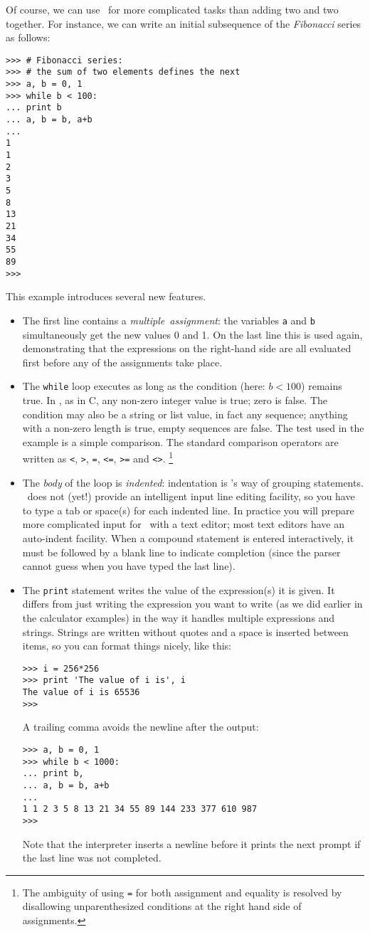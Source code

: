 Of course, we can use \Python\ for more complicated tasks than adding two
and two together.
For instance, we can write an initial subsequence of the
{\em Fibonacci}
series as follows:
\bcode\begin{verbatim}
>>> # Fibonacci series:
>>> # the sum of two elements defines the next
>>> a, b = 0, 1
>>> while b < 100:
... print b
... a, b = b, a+b
...
1
1
2
3
5
8
13
21
34
55
89
>>>
\end{verbatim}\ecode
This example introduces several new features.
\begin{itemize}
\item
The first line contains a
{\em multiple\ assignment}:
the variables
{\tt a}
and
{\tt b}
simultaneously get the new values 0 and 1.
On the last line this is used again, demonstrating that the expressions
on the right-hand side are all evaluated first before any of the
assignments take place.
\item
The
{\tt while}
loop executes as long as the condition (here: $b < 100$) remains true.
In \Python, as in C, any non-zero integer value is true; zero is false.
The condition may also be a string or list value, in fact any sequence;
anything with a non-zero length is true, empty sequences are false.
The test used in the example is a simple comparison.
The standard comparison operators are written as
{\tt <},
{\tt >},
{\tt =},
{\tt <=},
{\tt >=}
and
{\tt <>}.%
\footnote{
 The ambiguity of using {\tt =}
 for both assignment and equality is resolved by disallowing
 unparenthesized conditions at the right hand side of assignments.
}
\item
The
{\em body}
of the loop is
{\em indented}: indentation is \Python's way of grouping statements.
\Python\ does not (yet!) provide an intelligent input line editing
facility, so you have to type a tab or space(s) for each indented line.
In practice you will prepare more complicated input for \Python\ with a
text editor; most text editors have an auto-indent facility.
When a compound statement is entered interactively, it must be
followed by a blank line to indicate completion (since the parser
cannot guess when you have typed the last line).
\item
The
{\tt print}
statement writes the value of the expression(s) it is given.
It differs from just writing the expression you want to write (as we did
earlier in the calculator examples) in the way it handles multiple
expressions and strings.
Strings are written without quotes and a space is inserted between
items, so you can format things nicely, like this:
\bcode\begin{verbatim}
>>> i = 256*256
>>> print 'The value of i is', i
The value of i is 65536
>>>
\end{verbatim}\ecode
A trailing comma avoids the newline after the output:
\bcode\begin{verbatim}
>>> a, b = 0, 1
>>> while b < 1000:
... print b,
... a, b = b, a+b
...
1 1 2 3 5 8 13 21 34 55 89 144 233 377 610 987
>>>
\end{verbatim}\ecode
Note that the interpreter inserts a newline before it prints the next
prompt if the last line was not completed.
\end{itemize}

